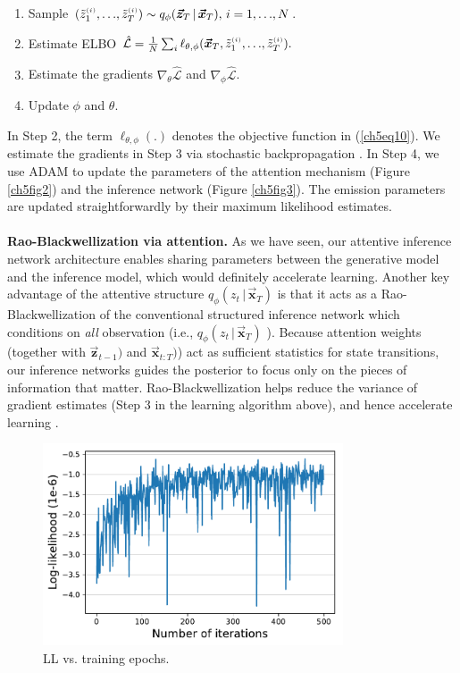 \documentclass [PhD] {uclathes}
\begin{document}
\begin{enumerate} 
\itemsep0em 
\item Sample $(\tilde{z}^{\mbox{\tiny $(i)$}}_1,.\,.\,.,\tilde{z}^{\mbox{\tiny $(i)$}}_T) \sim q_{\phi}(\boldsymbol{\vec{z}}_{T}\,|\,\boldsymbol{\vec{x}}_{T}),\, i = 1,.\,.\,.,N$.
\item Estimate ELBO $\hat{\mathcal{L}} = \frac{1}{N}\sum_{i}\ell_{\theta, \phi}(\boldsymbol{\vec{x}}_{T},\tilde{z}^{\mbox{\tiny $(i)$}}_1,.\,.\,.,\tilde{z}^{\mbox{\tiny $(i)$}}_T).$
\item Estimate the gradients $\nabla_{\theta} \hat{\mathcal{L}}$ and $\nabla_{\phi} \hat{\mathcal{L}}$.
\item Update $\phi$ and $\theta$.
\end{enumerate}

In Step 2, the term $\ell_{\theta, \phi}(.)$ denotes the objective function in (\ref{ch5eq10}). We estimate the gradients in Step 3 via stochastic backpropagation \cite{schulman2015gradient}. In Step 4, we use ADAM \cite{kingma2014adam} to update the parameters of the attention mechanism (Figure \ref{ch5fig2}) and the inference network (Figure \ref{ch5fig3}). The emission parameters are updated straightforwardly by their maximum likelihood estimates.\\ 
\\
{\bf Rao-Blackwellization via attention.} As we have seen, our attentive inference network architecture enables sharing parameters between the generative model and the inference model, which would definitely accelerate learning. Another key advantage of the attentive structure $q_{\phi}(z_t\,|\,\boldsymbol{\vec{x}}_{T})$ is that it acts as a Rao-Blackwellization of the conventional structured inference network which conditions on {\it all} observation (i.e., $q_{\phi}(z_t\,|\,\boldsymbol{\vec{x}}_{T})$ \cite{krishnan2017structured,zheng2017state,karl2016deep}). Because attention weights (together with $\boldsymbol{\vec{z}}_{t-1})$ and $\boldsymbol{\vec{x}}_{t:T})$) act as sufficient statistics for state transitions, our inference networks guides the posterior to focus only on the pieces of information that matter. Rao-Blackwellization helps reduce the variance of gradient estimates (Step 3 in the learning algorithm above), and hence accelerate learning \cite{ranganath2014black}.

\begin{figure}[t]
\centering
\includegraphics[width=3.5in]{ch5Fig4.pdf}
\caption{LL vs. training epochs.}
\label{ch5fig4}
\end{figure}
\end{document}
